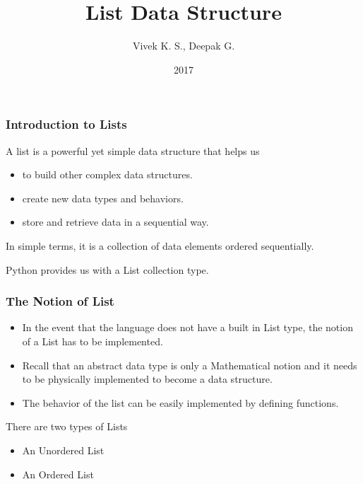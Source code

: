 \documentclass{beamer}
\title{List Data Structure}
\author{Vivek K. S., Deepak G.}
\institute{Information Systems Decision Sciences (ISDS)\\
MUMA College of Business\\
University of South Florida \\
Tampa, Florida}
\date{2017}
\begin{document}
 
\frame{\titlepage}
 
\begin{frame}
\frametitle{Introduction to Lists}
A list is a powerful yet simple data structure that helps us
\begin{itemize}

\item to build other complex data structures.

\item create new data types and behaviors.

\item store and retrieve data in a sequential way.

\end{itemize}

In simple terms, it is a collection of data elements ordered sequentially.

Python provides  us with a List collection type.

\end{frame}


\begin{frame}
\frametitle{The Notion of List}
\begin{itemize}

\item In the event that the language does not have a built in List type, the notion of a List has to be implemented.

\item Recall that an abstract data type is only a Mathematical notion and it needs to be physically implemented to become a data structure.

\item The behavior of the list can be easily implemented by defining functions.

\end{itemize}

There are two types of Lists

\begin{itemize}

\item An Unordered List
\item An Ordered List

\end{itemize}
\end{frame}
\end{document}

